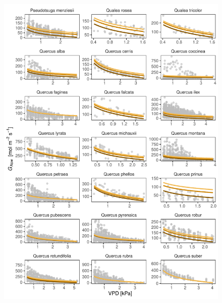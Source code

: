 \documentclass[11pt,twoside]{reedthesis}
\begin{document}
\begin{figure}[H]

{\centering \includegraphics[width=1\linewidth]{figure/appendixD/ggg6} 

}

\end{figure}
\end{document}
